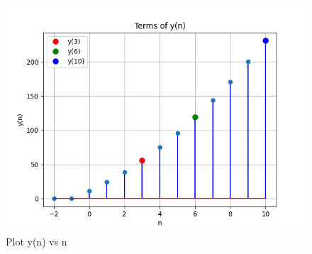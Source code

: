 \documentclass[journal,12pt,twocolumn]{IEEEtran}
\theoremstyle{remark}
\begin{document}
\newpage

\begin{figure}
    
    \includegraphics[width=\columnwidth]{figs/fig1.png}
    \caption{Plot y(n) vs n}
\end{figure}
\end{document}
